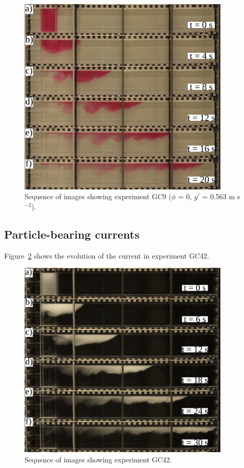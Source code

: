 \documentclass[authoryear,preprint,review,12pt]{elsarticle}
\begin{document}
\begin{figure}[ht!]
  \centerline{\includegraphics[width=0.9\textwidth]{GC9.pdf}}
  \caption{Sequence of images showing experiment GC9 ($\phi$ = 0, $g\prime$ = 0.563 m s$^{-2}$). }
  \label{fig:GC9}
\end{figure}

\subsection{Particle-bearing currents}
\label{subsec:res_w_parts}

Figure~\ref{fig:GC42} shows the evolution of the current in experiment GC42.

\begin{figure}[ht!]
  \centerline{\includegraphics[width=0.9\textwidth]{GC42.pdf}}
  \caption{Sequence of images showing experiment GC42. }
  \label{fig:GC42}
\end{figure}
\end{document}
